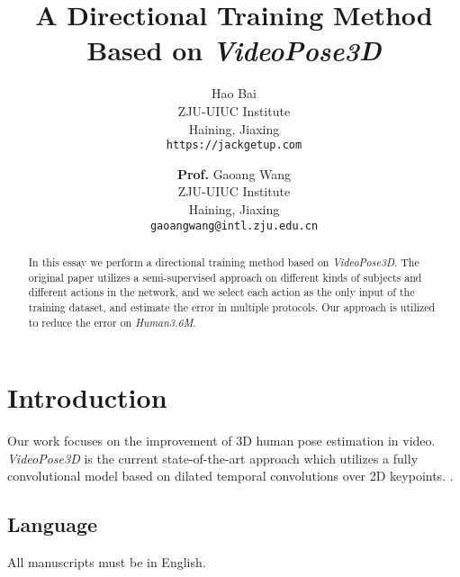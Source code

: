 \documentclass[10pt,twocolumn,letterpaper]{article}
\begin{document}
\title{A Directional Training Method Based on \textit{VideoPose3D}}

\author{Hao Bai\\
ZJU-UIUC Institute\\
Haining, Jiaxing\\
{\tt\small https://jackgetup.com}
\and
\textbf{Prof.} Gaoang Wang\\
ZJU-UIUC Institute\\
Haining, Jiaxing\\
{\tt\small gaoangwang@intl.zju.edu.cn}
}

\maketitle

\begin{abstract}
   In this essay we perform a directional training method based on \textit{VideoPose3D}. 
   The original paper utilizes a semi-supervised approach on different kinds of subjects
   and different actions in the network, and we select each action as the only input of
   the training dataset, and estimate the error in multiple protocols. Our approach is utilized
   to reduce the error on \textit{Human3.6M}.
\end{abstract}

\section{Introduction}

Our work focuses on the improvement of 3D human pose estimation in video.
\textit{VideoPose3D} is the current state-of-the-art approach which utilizes a fully convolutional model based on dilated temporal convolutions over 2D keypoints. \cite{pavllo20193d,pavlakos2017coarse}. 


\subsection{Language}

All manuscripts must be in English.
\end{document}
